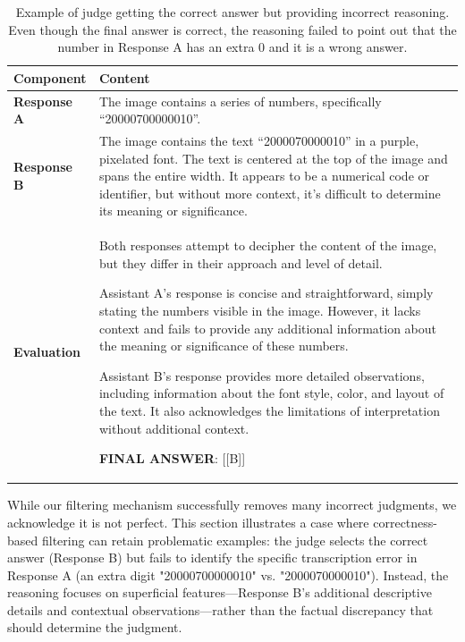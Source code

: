 \begin{table}[h!]
\centering
\small
\begin{tabular}{>{\raggedright\arraybackslash}p{2.5cm}p{12cm}}
\toprule
\textbf{Component} & \textbf{Content} \\
\midrule
\textbf{Response A} & The image contains a series of numbers, specifically ``20000700000010''. \\
\midrule
\textbf{Response B} & The image contains the text ``2000070000010'' in a purple, pixelated font. The text is centered at the top of the image and spans the entire width. It appears to be a numerical code or identifier, but without more context, it's difficult to determine its meaning or significance. \\
\midrule
\textbf{Evaluation} & Both responses attempt to decipher the content of the image, but they differ in their approach and level of detail.

Assistant A's response is concise and straightforward, simply stating the numbers visible in the image. However, it lacks context and fails to provide any additional information about the meaning or significance of these numbers.

Assistant B's response provides more detailed observations, including information about the font style, color, and layout of the text. It also acknowledges the limitations of interpretation without additional context.

\textbf{FINAL ANSWER}: [[B]] \\
\bottomrule
\end{tabular}
\caption{Example of judge getting the correct answer but providing incorrect reasoning. Even though the final answer is correct, the reasoning failed to point out that the number in Response A has an extra 0 and it is a wrong answer.}
\label{tab:counter_example}
\end{table}


While our filtering mechanism successfully removes many incorrect judgments, 
we acknowledge it is not perfect. This section illustrates a case where correctness-
based filtering can retain problematic examples: the judge selects the correct 
answer (Response B) but fails to identify the specific transcription error in 
Response A (an extra digit "20000700000010" vs. "2000070000010"). Instead, the 
reasoning focuses on superficial features—Response B's additional descriptive 
details and contextual observations—rather than the factual discrepancy that 
should determine the judgment.

